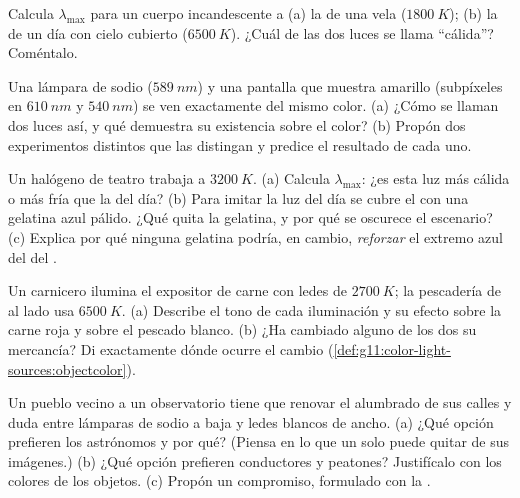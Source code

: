 \begin{exercise}[$\star\star$]\label{exo:g11:color-light-sources:11}
Calcula $\lambda_{\max}$ para un cuerpo incandescente a (a) la
 de una vela ($\qty{1800}{K}$); (b) la de un día con
cielo cubierto ($\qty{6500}{K}$). ¿Cuál de las dos luces se llama
``cálida''? Coméntalo.
\end{exercise}

\begin{exercise}[$\star\star\star$]\label{exo:g11:color-light-sources:12}
Una lámpara de sodio ($\qty{589}{nm}$) y una pantalla que muestra
amarillo (subpíxeles en $\qty{610}{nm}$ y $\qty{540}{nm}$) se ven
exactamente del mismo color. (a) ¿Cómo se llaman dos luces así, y qué
demuestra su existencia sobre el color? (b) Propón dos experimentos
distintos que las distingan y predice el resultado de cada uno.
\end{exercise}

\begin{exercise}[$\star\star\star$]\label{exo:g11:color-light-sources:13}
Un  halógeno de teatro trabaja a $\qty{3200}{K}$. (a) Calcula
$\lambda_{\max}$: ¿es esta luz más cálida o más fría que la del día? (b)
Para imitar la luz del día se cubre el  con una gelatina azul
pálido. ¿Qué quita la gelatina, y por qué se oscurece el escenario? (c)
Explica por qué ninguna gelatina podría, en cambio, \emph{reforzar} el
extremo azul del  del .
\end{exercise}

\begin{exercise}[$\star\star\star$]\label{exo:g11:color-light-sources:14}
Un carnicero ilumina el expositor de carne con ledes de  $\qty{2700}{K}$; la pescadería de al lado usa $\qty{6500}{K}$. (a)
Describe el tono de cada iluminación y su efecto sobre la carne roja y
sobre el pescado blanco. (b) ¿Ha cambiado alguno de los dos su
mercancía? Di exactamente dónde ocurre el cambio
(\cref{def:g11:color-light-sources:objectcolor}).
\end{exercise}

\begin{exercise}[$\star\star\star$]\label{exo:g11:color-light-sources:15}
Un pueblo vecino a un observatorio tiene que renovar el alumbrado de sus
calles y duda entre lámparas de sodio a baja  y ledes blancos de
 ancho. (a) ¿Qué opción prefieren los astrónomos y por qué?
(Piensa en lo que un solo  puede quitar de sus imágenes.) (b) ¿Qué
opción prefieren conductores y peatones? Justifícalo con los colores de
los objetos. (c) Propón un compromiso, formulado con la .
\end{exercise}

